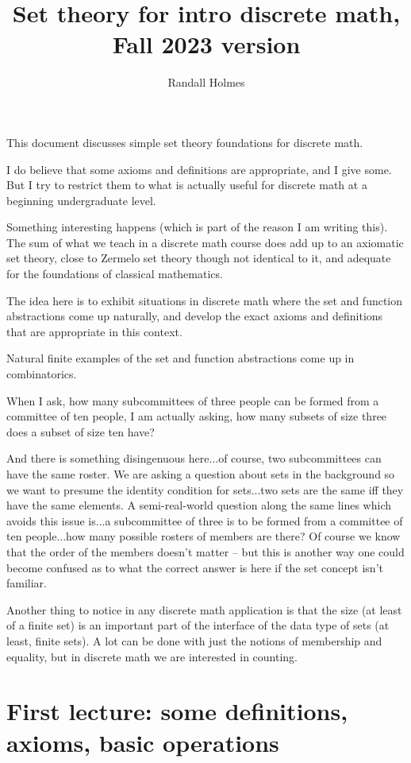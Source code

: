 \documentclass[12pt]{article}
\title{Set theory for intro discrete math, Fall 2023 version}
\author{Randall Holmes}
\begin{document}
\maketitle

This document discusses simple set theory foundations for discrete math.

I do believe that some axioms and definitions are appropriate, and I give some.  But I try to restrict them to what is actually useful for discrete math at a beginning undergraduate level.

Something interesting happens (which is part of the reason I am writing this).  The sum of what we teach in a discrete math course does add up to an axiomatic set theory, close to Zermelo set theory though not identical to it, and adequate for the foundations of classical mathematics.

The idea here is to exhibit situations in discrete math where the set and function abstractions come up naturally, and develop the exact axioms and definitions that are appropriate in this context.

Natural finite examples of the set and function abstractions come up in combinatorics.

When I ask, how many subcommittees of three people can be formed from a committee of ten people, I am actually asking, how many subsets of size three does a subset of size ten have?

And there is something disingenuous here...of course, two subcommittees can have the same roster.  We are asking a question about sets in the background so we want to presume the identity condition for sets...two sets are the same iff they have the same elements.   A semi-real-world question along the same lines which avoids this issue is...a subcommittee of three is to be formed from a committee of ten people...how many possible rosters of members are there?  Of course we know that the order of the members doesn't matter -- but this is another way one could become confused as to what the correct answer is here if the set concept isn't familiar.

Another thing to notice in any discrete math application is that the size (at least of a finite set) is an important part of the interface of the data type of sets (at least, finite sets).  A lot can be done with just the notions of membership and equality, but in discrete math we are interested in counting.

\section{First lecture:  some definitions, axioms, basic operations}
\end{document}
